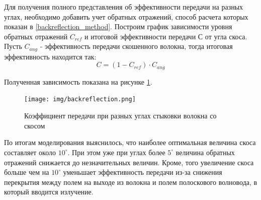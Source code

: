 Для получения полного представления об эффективности передачи на разных углах, необходимо добавить учет обратных отражений, способ расчета которых показан в \ref{backreflection_method}. Построим график зависимости уровня обратных отражений $C_{ref}$ и итоговой эффективности передачи $С$ от угла скоса. Пусть $C_{ang}$ - эффективность передачи скошенного волокна, тогда итоговая эффективность находится так:
\begin{equation}
	C = (1-C_{ref}) \cdot C_{ang}
\end{equation}

Полученная зависимость показана на рисунке \ref{backreflection}.

\begin{figure}[h!]
	\texttt{[image: img/backreflection.png]}
	\caption{Коэффициент передачи при разных углах стыковки волокна со скосом}
	\label{backreflection}
\end{figure}

По итогам моделирования выяснилось, что наиболее оптимальная величина скоса составляет около $10^\circ$. При этом уже при углах более $5^\circ$ величина обратных отражений снижается до незначительных величин. Кроме, того увеличение скоса больше чем на $10^\circ$ уменьшает эффективность передачи из-за снижения перекрытия между полем на выходе из волокна и полем полоскового волновода, в который вводится излучение.
